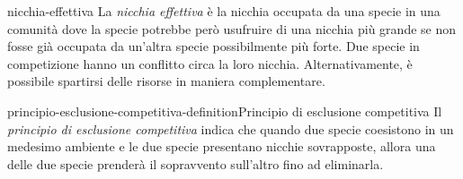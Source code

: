 \documentclass[preview]{standalone}
\begin{document}
\begin{snippet}{nicchia-effettiva}
    La \textit{nicchia effettiva} è la nicchia occupata da una specie in una comunità
    dove la specie potrebbe però usufruire di una nicchia più grande se
    non fosse già occupata da un'altra specie possibilmente più forte.
    Due specie in competizione hanno un conflitto circa la loro nicchia.
    Alternativamente, è possibile spartirsi delle risorse in maniera complementare.
\end{snippet}

\begin{snippetdefinition}{principio-esclusione-competitiva-definition}{Principio di esclusione competitiva}
    Il \textit{principio di esclusione competitiva} indica che quando due specie coesistono in un medesimo ambiente e le due specie
    presentano nicchie sovrapposte, allora una delle due specie prenderà il sopravvento sull'altro
    fino ad eliminarla.
\end{snippetdefinition}

\end{document}
